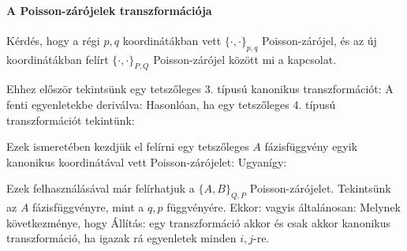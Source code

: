    \paragraph{A Poisson-zárójelek transzformációja}
   Kérdés, hogy a régi $p,q$ koordinátákban vett $\{\cdot,\cdot\}_{p,q}$ Poisson-zárójel, és az új koordinátákban felírt $\{\cdot,\cdot\}_{P,Q}$ Poisson-zárójel között mi a kapcsolat. 
   
   Ehhez először tekintsünk egy tetszőleges 3. típusú kanonikus transzformációt:
   A fenti egyenletekbe deriválva:
   Hasonlóan, ha egy tetszőleges 4. típusú transzformációt tekintünk:
   
   Ezek ismeretében kezdjük el felírni egy tetszőleges $A$ fázisfüggvény egyik kanonikus koordinátával vett Poisson-zárójelet:
   Ugyanígy:
   
   Ezek felhasználásával már felírhatjuk a $\{A,B\}_{Q,P}$ Poisson-zárójelet. Tekintsünk az $A$ fázisfüggvényre, mint a $q,p$ függvényére. Ekkor:
   vagyis általánosan:
   Melynek következménye, hogy
   Állítás: egy transzformáció akkor és csak akkor kanonikus transzformáció, ha igazak rá  egyenletek minden $i,j$-re. 
   

